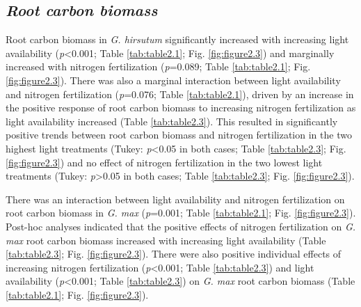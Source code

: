 \subsection{\textit{Root carbon biomass}}
\noindent Root carbon biomass in \textit{G. hirsutum} significantly increased with increasing light availability (\textit{p}<0.001; Table \ref{tab:table2.1}; Fig. \ref{fig:figure2.3}) and marginally increased with nitrogen fertilization (\textit{p}=0.089; Table \ref{tab:table2.1}; Fig. \ref{fig:figure2.3}). There was also a marginal interaction between light availability and nitrogen fertilization (\textit{p}=0.076; Table \ref{tab:table2.1}), driven by an increase in the positive response of root carbon biomass to increasing nitrogen fertilization as light availability increased (Table \ref{tab:table2.3}). This resulted in significantly positive trends between root carbon biomass and nitrogen fertilization in the two highest light treatments (Tukey: \textit{p}<0.05 in both cases; Table \ref{tab:table2.3}; Fig. \ref{fig:figure2.3}) and no effect of nitrogen fertilization in the two lowest light treatments (Tukey: \textit{p}>0.05 in both cases; Table \ref{tab:table2.3}; Fig. \ref{fig:figure2.3}). 

There was an interaction between light availability and nitrogen fertilization on root carbon biomass in \textit{G. max} (\textit{p}=0.001; Table \ref{tab:table2.1}; Fig. \ref{fig:figure2.3}). Post-hoc analyses indicated that the positive effects of nitrogen fertilization on \textit{G. max} root carbon biomass increased with increasing light availability (Table \ref{tab:table2.3}; Fig. \ref{fig:figure2.3}). There were also positive individual effects of increasing nitrogen fertilization (\textit{p}<0.001; Table \ref{tab:table2.3}) and light availability (\textit{p}<0.001; Table \ref{tab:table2.3}) on \textit{G. max} root carbon biomass (Table \ref{tab:table2.1}; Fig. \ref{fig:figure2.3}).

